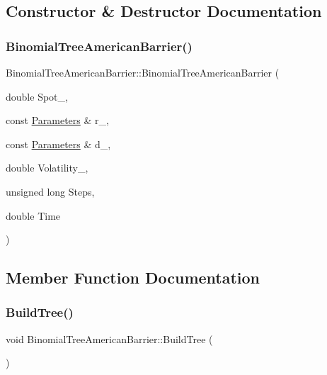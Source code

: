 \subsection{Constructor \& Destructor Documentation}
\hypertarget{classBinomialTreeAmericanBarrier_aa02aa598a64b7372957117d92f037977}{}\label{classBinomialTreeAmericanBarrier_aa02aa598a64b7372957117d92f037977} 
\subsubsection{\texorpdfstring{Binomial\+Tree\+American\+Barrier()}{BinomialTreeAmericanBarrier()}}
{\footnotesize\ttfamily Binomial\+Tree\+American\+Barrier\+::\+Binomial\+Tree\+American\+Barrier (\begin{DoxyParamCaption}\item[{double}]{Spot\+\_\+,  }\item[{const \hyperlink{classParameters}{Parameters} \&}]{r\+\_\+,  }\item[{const \hyperlink{classParameters}{Parameters} \&}]{d\+\_\+,  }\item[{double}]{Volatility\+\_\+,  }\item[{unsigned long}]{Steps,  }\item[{double}]{Time }\end{DoxyParamCaption})}



\subsection{Member Function Documentation}
\hypertarget{classBinomialTreeAmericanBarrier_adaae6378697610ce4f9bc2be3912aed6}{}\label{classBinomialTreeAmericanBarrier_adaae6378697610ce4f9bc2be3912aed6} 
\subsubsection{\texorpdfstring{Build\+Tree()}{BuildTree()}}
{\footnotesize\ttfamily void Binomial\+Tree\+American\+Barrier\+::\+Build\+Tree (\begin{DoxyParamCaption}{ }\end{DoxyParamCaption})\hspace{0.3cm}{\ttfamily [protected]}}

